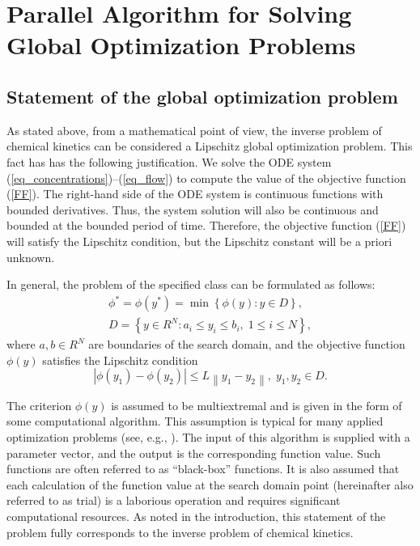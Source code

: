 \documentclass[mathematics,article,submit,pdftex,moreauthors]{Definitions/mdpi}
\begin{document}
\section{Parallel Algorithm for Solving Global Optimization Problems }\label{sec_GSA}

\subsection{Statement of the global optimization problem}

As stated above, from a mathematical point of view, the inverse problem of chemical kinetics can be considered a Lipschitz global optimization problem.
\textcolor[rgb]{1,0,0}{This fact has has the following justification.
We solve the ODE system (\ref{eq_concentrations})--(\ref{eq_flow}) to compute the value of the objective function (\ref{FF}). The right-hand side of the ODE system is continuous functions with bounded derivatives. Thus, the system solution will also be continuous and bounded at the bounded period of time. Therefore, the objective function (\ref{FF}) will satisfy the Lipschitz condition, but the Lipschitz constant will be a priori unknown.}

In general, the problem of the specified class can be formulated as follows:
\begin{gather}
 \phi^* = \phi(y^\ast)=\min{\left\{\phi(y):y\in D\right\}}, \label{problemN}\\
 D=\left\{y\in R^N: a_i\leq y_i \leq b_i, \;  1\leq i \leq N\right\} \label{D},
\end{gather}
where $a,b \in R^N$ are boundaries of the search domain, and the objective function $\phi(y)$ satisfies the Lipschitz condition
\begin{equation}\label{Lip}
\left|\phi(y_1)-\phi(y_2)\right|\leq L\left\|y_1-y_2\right\|,\; y_1,y_2 \in D.
\end{equation}

The criterion $\phi(y)$ is assumed to be multiextremal and is given in the form of some computational algorithm. 
\textcolor[rgb]{1,0,0}{This assumption is typical for many applied optimization problems (see, e.g., \cite{Kvasov2013,Kalyulin2017}).}
The input of this algorithm is supplied with a parameter vector, and the output is the corresponding function value. Such functions are often referred to as ``black-box'' functions. It is also assumed that each calculation of the function value at the search domain point (hereinafter also referred to as trial) is a laborious operation and requires significant computational resources. As noted in the introduction, this statement of the problem fully corresponds to the inverse problem of chemical kinetics.
\end{document}
